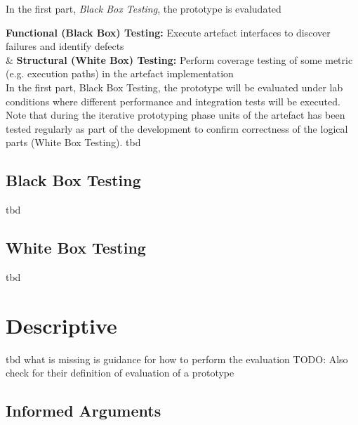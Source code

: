 In the first part, \textit{Black Box Testing}, the prototype is evaludated


				\textbf{Functional (Black Box) Testing:} Execute artefact interfaces to discover failures and identify defects \\
				\hhline{|~|-|}
				& \textbf{Structural (White Box) Testing:} Perform coverage testing of some metric (e.g. execution paths) in the artefact implementation \\

In the first part, Black Box Testing, the prototype will be evaluated under lab conditions where different performance and integration tests will be executed. Note that during the iterative prototyping phase units of the artefact has been tested regularly as part of the development to confirm correctness of the logical parts (White Box Testing).
tbd


\subsection{Black Box Testing}

tbd



\subsection{White Box Testing}

tbd



\section{Descriptive}

tbd
what is missing is guidance for how to perform the evaluation
TODO: Also check \cite{Peffers2012} for their definition of evaluation of a prototype


\subsection{Informed Arguments}

